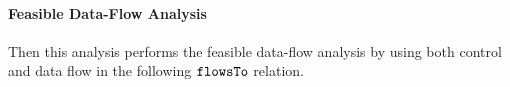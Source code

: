 \paragraph{Feasible Data-Flow Analysis}
Then this analysis performs the feasible data-flow analysis by using both control and data flow in the following $\mathtt{flowsTo}$ relation.
%
%
